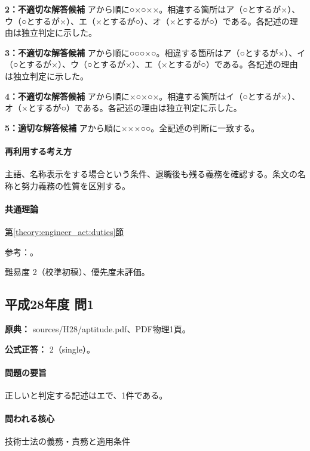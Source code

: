 \noindent\textbf{2：不適切な解答候補} アから順に○×○××。相違する箇所はア（○とするが×）、ウ（○とするが×）、エ（×とするが○）、オ（×とするが○）である。各記述の理由は独立判定に示した。\par

\noindent\textbf{3：不適切な解答候補} アから順に○○○×○。相違する箇所はア（○とするが×）、イ（○とするが×）、ウ（○とするが×）、エ（×とするが○）である。各記述の理由は独立判定に示した。\par

\noindent\textbf{4：不適切な解答候補} アから順に×○×○×。相違する箇所はイ（○とするが×）、オ（×とするが○）である。各記述の理由は独立判定に示した。\par

\noindent\textbf{5：適切な解答候補} アから順に×××○○。全記述の判断に一致する。\par

\paragraph{再利用する考え方} 主語、名称表示をする場合という条件、退職後も残る義務を確認する。条文の名称と努力義務の性質を区別する。

\paragraph{共通理論} \hyperref[theory:engineer_act:duties]{第\ref*{theory:engineer_act:duties}節}

\par 参考：\cite{engineer_act_current}。

\par 難易度 2（校準初稿）、優先度未評価。

\subsection{平成28年度 問1}
\label{q:h28-reg-apt-01}

\noindent\textbf{原典：} sources/H28/aptitude.pdf、PDF物理1頁。

\textbf{公式正答：} 2（single）。

\paragraph{問題の要旨} 正しいと判定する記述はエで、1件である。

\paragraph{問われる核心} 技術士法の義務・責務と適用条件

